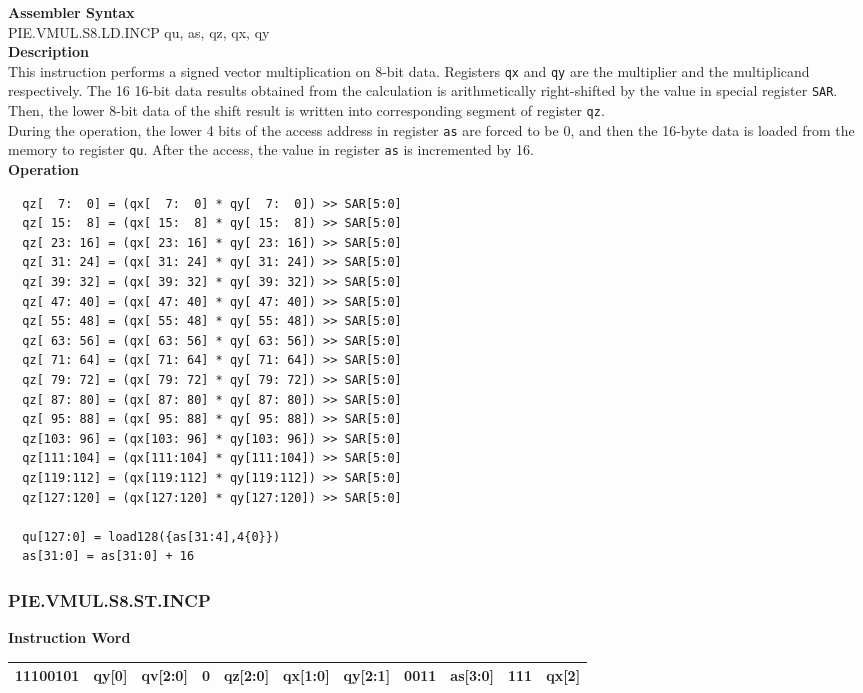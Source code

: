 \textbf{Assembler Syntax} \\
PIE.VMUL.S8.LD.INCP qu, as, qz, qx, qy \\
\textbf{Description} \\
This instruction performs a signed vector multiplication on 8-bit data. Registers \lstinline{qx} and \lstinline{qy} are the multiplier and the multiplicand respectively. The 16 16-bit data results obtained from the calculation is arithmetically right-shifted by the value in special register \lstinline{SAR}. Then, the lower 8-bit data of the shift result is written into corresponding segment of register \lstinline{qz}. \\ During the operation, the lower 4 bits of the access address in register \lstinline{as} are forced to be 0, and then the 16-byte data is loaded from the memory to register \lstinline{qu}. After the access, the value in register \lstinline{as} is incremented by 16.\\
\textbf{Operation}
\begin{lstlisting}
  qz[  7:  0] = (qx[  7:  0] * qy[  7:  0]) >> SAR[5:0]
  qz[ 15:  8] = (qx[ 15:  8] * qy[ 15:  8]) >> SAR[5:0]
  qz[ 23: 16] = (qx[ 23: 16] * qy[ 23: 16]) >> SAR[5:0]
  qz[ 31: 24] = (qx[ 31: 24] * qy[ 31: 24]) >> SAR[5:0]
  qz[ 39: 32] = (qx[ 39: 32] * qy[ 39: 32]) >> SAR[5:0]
  qz[ 47: 40] = (qx[ 47: 40] * qy[ 47: 40]) >> SAR[5:0]
  qz[ 55: 48] = (qx[ 55: 48] * qy[ 55: 48]) >> SAR[5:0]
  qz[ 63: 56] = (qx[ 63: 56] * qy[ 63: 56]) >> SAR[5:0]
  qz[ 71: 64] = (qx[ 71: 64] * qy[ 71: 64]) >> SAR[5:0]
  qz[ 79: 72] = (qx[ 79: 72] * qy[ 79: 72]) >> SAR[5:0]
  qz[ 87: 80] = (qx[ 87: 80] * qy[ 87: 80]) >> SAR[5:0]
  qz[ 95: 88] = (qx[ 95: 88] * qy[ 95: 88]) >> SAR[5:0]
  qz[103: 96] = (qx[103: 96] * qy[103: 96]) >> SAR[5:0]
  qz[111:104] = (qx[111:104] * qy[111:104]) >> SAR[5:0]
  qz[119:112] = (qx[119:112] * qy[119:112]) >> SAR[5:0]
  qz[127:120] = (qx[127:120] * qy[127:120]) >> SAR[5:0]

  qu[127:0] = load128({as[31:4],4{0}})
  as[31:0] = as[31:0] + 16
\end{lstlisting}

\newpage
\subsubsection{PIE.VMUL.S8.ST.INCP}\label{instruction:PIEVMULS8STINCP}
\setlength\tabcolsep{6pt}
\textbf{Instruction Word} \\
\begin{tabular}{|c|c|c|c|c|c|c|c|c|c|c|}
	\hline
	11100101 & qy[0] & qv[2:0] & 0 & qz[2:0] & qx[1:0] & qy[2:1] & 0011 & as[3:0] & 111 & qx[2] \\
	\hline
\end{tabular}

